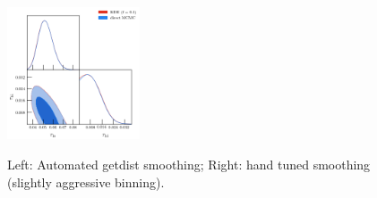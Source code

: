 \documentclass[prd,amsmath,amssymb,floatfix,superscriptaddress,nofootinbib]{revtex4-1}
\newcommand{\taulo}{$\tau_{\rm lo}\,$}
\begin{document}
\begin{figure}
\includegraphics[width=0.35\textwidth]{cosmomc_kde/pl18_tanh_highz_test5_run1_vs_relike_tanh_highz_test9_run3_f0p10_taulo_prior_0p03_zre_prior_6p1_taulo_prior_0p0_tri_smooth_scale_1D_2_num_bins_1D_20_smooth_scale_2D_2_num_bins_2D_25.png}
%
\label{fig:}
\caption{Left: Automated getdist smoothing; Right: hand tuned smoothing (slightly aggressive binning).
} 
\end{figure}

\end{document}

